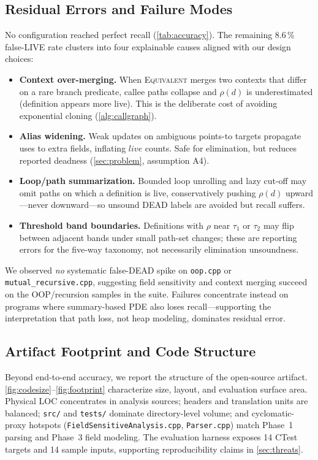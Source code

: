 \documentclass[acmsmall,screen,review,anonymous]{acmart}
\begin{document}
\subsection{Residual Errors and Failure Modes}
No configuration reached perfect recall (\autoref{tab:accuracy}). The remaining 8.6\,\% false-LIVE rate clusters into four explainable causes aligned with our design choices:
\begin{itemize}[leftmargin=*,itemsep=1pt]
\item \textbf{Context over-merging.} When \textsc{Equivalent} merges two contexts that differ on a rare branch predicate, callee paths collapse and $\rho(d)$ is underestimated (definition appears more live). This is the deliberate cost of avoiding exponential cloning (\autoref{alg:callgraph}).
\item \textbf{Alias widening.} Weak updates on ambiguous points-to targets propagate uses to extra fields, inflating $live$ counts. Safe for elimination, but reduces reported deadness (\autoref{sec:problem}, assumption A4).
\item \textbf{Loop/path summarization.} Bounded loop unrolling and lazy cut-off may omit paths on which a definition is live, conservatively pushing $\rho(d)$ upward---never downward---so unsound DEAD labels are avoided but recall suffers.
\item \textbf{Threshold band boundaries.} Definitions with $\rho$ near $\tau_1$ or $\tau_2$ may flip between adjacent bands under small path-set changes; these are reporting errors for the five-way taxonomy, not necessarily elimination unsoundness.
\end{itemize}
We observed \emph{no} systematic false-DEAD spike on \texttt{oop.cpp} or \texttt{mutual\_recursive.cpp}, suggesting field sensitivity and context merging succeed on the OOP/recursion samples in the suite. Failures concentrate instead on programs where summary-based PDE also loses recall---supporting the interpretation that path loss, not heap modeling, dominates residual error.

\subsection{Artifact Footprint and Code Structure}
Beyond end-to-end accuracy, we report the structure of the open-source artifact. \autoref{fig:codesize}--\autoref{fig:footprint} characterize size, layout, and evaluation surface area. Physical LOC concentrates in analysis sources; headers and translation units are balanced; \texttt{src/} and \texttt{tests/} dominate directory-level volume; and cyclomatic-proxy hotspots (\texttt{FieldSensitiveAnalysis.cpp}, \texttt{Parser.cpp}) match Phase~1 parsing and Phase~3 field modeling. The evaluation harness exposes 14 CTest targets and 14 sample inputs, supporting reproducibility claims in \autoref{sec:threats}.
\end{document}
